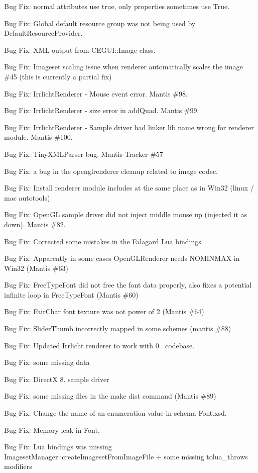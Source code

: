\begin{DoxyItemize}
\item Bug Fix\+: normal attributes use \textquotesingle{}true\textquotesingle{}, only properties sometimes use \textquotesingle{}True\textquotesingle{}.
\item Bug Fix\+: Global default resource group was not being used by Default\+Resource\+Provider.
\item Bug Fix\+: X\+ML output from C\+E\+G\+U\+I\+::\+Image class.
\item Bug Fix\+: Imageset scaling issue when renderer automatically scales the image \#45 (this is currently a partial fix)
\item Bug Fix\+: Irrlicht\+Renderer -\/ Mouse event error. Mantis \#98.
\item Bug Fix\+: Irrlicht\+Renderer -\/ size error in add\+Quad. Mantis \#99.
\item Bug Fix\+: Irrlicht\+Renderer -\/ Sample driver had linker lib name wrong for renderer module. Mantis \#100.
\item Bug Fix\+: Tiny\+X\+M\+L\+Parser bug. Mantis Tracker \#57
\item Bug Fix\+: a bug in the openglrenderer cleanup related to image codec.
\item Bug Fix\+: Install renderer module includes at the same place as in Win32 (linux / mac autotools)
\item Bug Fix\+: Open\+GL sample driver did not inject middle mouse up (injected it as down). Mantis \#82.
\item Bug Fix\+: Corrected some mistakes in the Falagard Lua bindings
\item Bug Fix\+: Apparently in some cases Open\+G\+L\+Renderer needs N\+O\+M\+I\+N\+M\+AX in Win32 (Mantis \#63)
\item Bug Fix\+: Free\+Type\+Font did not free the font data properly, also fixes a potential infinite loop in Free\+Type\+Font (Mantis \#60)
\item Bug Fix\+: Fair\+Char font texture was not power of 2 (Mantis \#64)
\item Bug Fix\+: Slider\+Thumb incorrectly mapped in some schemes (mantis \#88)
\item Bug Fix\+: Updated Irrlicht renderer to work with 0.. codebase.
\item Bug Fix\+: some missing data
\item Bug Fix\+: DirectX 8. sample driver
\item Bug Fix\+: some missing files in the make dist command (Mantis \#89)
\item Bug Fix\+: Change the name of an enumeration value in schema Font.\+xsd.
\item Bug Fix\+: Memory leak in Font.
\item Bug Fix\+: Lua bindings was missing Imageset\+Manager\+::create\+Imageset\+From\+Image\+File + some missing tolua\+\_\+throws modifiers
\end{DoxyItemize}

